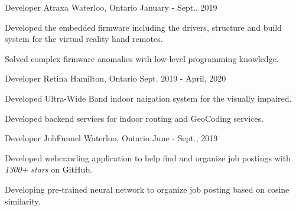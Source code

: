 
\begin{cventries}

  \cventry
    {Developer} %
    {Atraxa} %
    {Waterloo, Ontario} %
    {January - Sept., 2019} %
    {
      \begin{cvitems} %
        \item {Developed the embedded firmware including the drivers, structure and build system for the virtual reality hand remotes.}
        \item {Solved complex firmware anomalies with low-level programming knowledge.}
      \end{cvitems}
    }

  \cventry
    {Developer} %
    {Retina} %
    {Hamilton, Ontario} %
    {Sept. 2019 - April, 2020} %
    {
      \begin{cvitems} %
        \item {Developed Ultra-Wide Band indoor naigation system for the visually impaired.}
        \item {Developed backend services for indoor routing and GeoCoding services.}
      \end{cvitems}
    }

  \cventry
    {Developer} %
    {JobFunnel} %
    {Waterloo, Ontario} %
    {June - Sept., 2019} %
    {
      \begin{cvitems} %
        \item {Developed webcrawling application to help find and organize job postings with \textit{1300+ stars} on GitHub.}
        \item {Developing pre-trained neural network to organize job posting based on cosine similarity.}
      \end{cvitems}
    }


\end{cventries}
